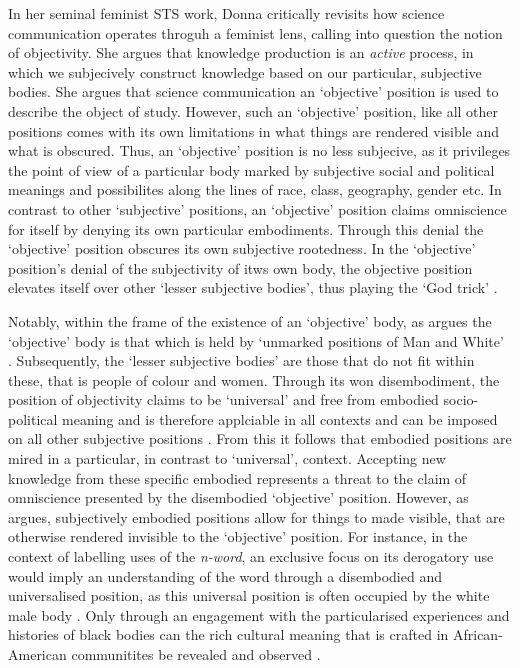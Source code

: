 In her seminal feminist STS work, Donna \citet{Haraway:1988} critically revisits how science communication operates throguh a feminist lens, calling into question the notion of objectivity. She argues that knowledge production is an \textit{active} process, in which we subjecively construct knowledge based on our particular, subjective bodies. She argues that science communication an `objective' position is used to describe the object of study. However, such an `objective' position, like all other positions comes with its own limitations in what things are rendered visible and what is obscured. Thus, an `objective' position is no less subjecive, as it privileges the point of view of a particular body marked by subjective social and political meanings and possibilites along the lines of race, class, geography, gender etc. In contrast to other `subjective' positions, an `objective' position claims omniscience for itself by denying its own particular embodiments. Through this denial the `objective' position obscures its own subjective rootedness. In the `objective' position's denial of the subjectivity of itws own body, the objective position elevates itself over other `lesser subjective bodies', thus playing the `God trick' \cite{Haraway:1988}. 

Notably, within the frame of the existence of an `objective' body, as \citet{Haraway:1988} argues the `objective' body is that which is held by `unmarked positions of Man and White' \cite[p. 8]{Haraway:1988}. Subsequently, the `lesser subjective bodies' are those that do not fit within these, that is people of colour and women. Through its won disembodiment, the position of objectivity claims to be `universal' and free from embodied socio-political meaning and is therefore applciable in all contexts and can be imposed on all other subjective positions \cite{Mohanty:1984}. From this it follows that embodied positions are mired in a particular, in contrast to `universal', context. Accepting new knowledge from these specific embodied represents a threat to the claim of omniscience presented by the disembodied `objective' position. However, as \citet{Haraway:1988} argues, subjectively embodied positions allow for things to made visible, that are otherwise rendered invisible to the `objective' position. For instance, in the context of labelling uses of the \textit{n-word}, an exclusive focus on its derogatory use would imply an understanding of the word through a disembodied and universalised position, as this universal position is often occupied by the white male body \citep{Haraway:1988}. Only through an engagement with the particularised experiences and histories of black bodies can the rich cultural meaning that is crafted in African-American communitites be revealed and observed \cite{Rahman:2012}.

